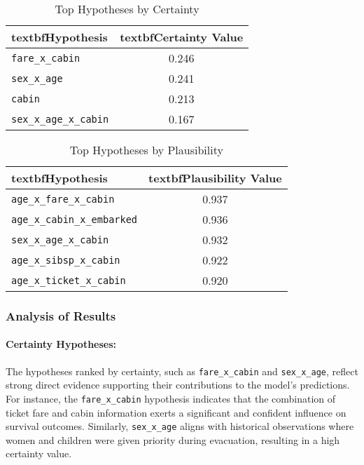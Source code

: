 \documentclass[acmlarge]{acmart}
\begin{document}
\begin{table}[H]
    \caption{Top Hypotheses by Certainty}
    \label{tab:top_certainty}
    \centering
    \begin{tabular}{|l|c|}
        \hline
        textbf{Hypothesis} & textbf{Certainty Value} \\
        \hline
        \texttt{fare\_x\_cabin} & 0.246 \\
        \texttt{sex\_x\_age} & 0.241 \\
        \texttt{cabin} & 0.213 \\
        \texttt{sex\_x\_age\_x\_cabin} & 0.167 \\
        \hline
    \end{tabular}
\end{table}

\begin{table}[H]
    \caption{Top Hypotheses by Plausibility}
    \label{tab:top_plausibility}
    \centering
    \begin{tabular}{|l|c|}
        \hline
        textbf{Hypothesis} & textbf{Plausibility Value} \\
        \hline
        \texttt{age\_x\_fare\_x\_cabin} & 0.937 \\
        \texttt{age\_x\_cabin\_x\_embarked} & 0.936 \\
        \texttt{sex\_x\_age\_x\_cabin} & 0.932 \\
        \texttt{age\_x\_sibsp\_x\_cabin} & 0.922 \\
        \texttt{age\_x\_ticket\_x\_cabin} & 0.920 \\
        \hline
    \end{tabular}
\end{table}

\subsubsection{Analysis of Results}

\paragraph{Certainty Hypotheses:}  
The hypotheses ranked by certainty, such as \texttt{fare\_x\_cabin} and \texttt{sex\_x\_age}, reflect strong direct evidence supporting their contributions to the model's predictions. For instance, the \texttt{fare\_x\_cabin} hypothesis indicates that the combination of ticket fare and cabin information exerts a significant and confident influence on survival outcomes. Similarly, \texttt{sex\_x\_age} aligns with historical observations where women and children were given priority during evacuation, resulting in a high certainty value.
\end{document}
